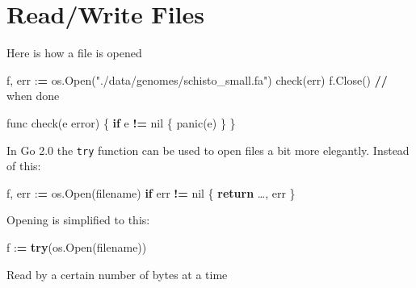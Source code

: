 \documentclass[]{book}
\newenvironment{Shaded}{\begin{snugshade}}{\end{snugshade}}
\newcommand{\CharTok}[1]{\textcolor[rgb]{0.31,0.60,0.02}{#1}}
\newcommand{\ControlFlowTok}[1]{\textcolor[rgb]{0.13,0.29,0.53}{\textbf{#1}}}
\newcommand{\DecValTok}[1]{\textcolor[rgb]{0.00,0.00,0.81}{#1}}
\newcommand{\NormalTok}[1]{#1}
\newcommand{\OperatorTok}[1]{\textcolor[rgb]{0.81,0.36,0.00}{\textbf{#1}}}
\newcommand{\SpecialCharTok}[1]{\textcolor[rgb]{0.00,0.00,0.00}{#1}}
\newcommand{\StringTok}[1]{\textcolor[rgb]{0.31,0.60,0.02}{#1}}
\begin{document}
\hypertarget{readwrite-files}{%
\section{Read/Write Files}\label{readwrite-files}}

Here is how a file is opened

\begin{Shaded}
\begin{Highlighting}[]
\NormalTok{f, err :}\OperatorTok{=}\NormalTok{ os.Open(}\StringTok{"./data/genomes/schisto_small.fa"}\NormalTok{)}
\NormalTok{check(err)}
\NormalTok{f.Close() }\OperatorTok{//}\NormalTok{ when done}

\NormalTok{func check(e error) \{}
    \ControlFlowTok{if}\NormalTok{ e }\OperatorTok{!=}\NormalTok{ nil \{    }
\NormalTok{        panic(e)     }
\NormalTok{    \}                }
\NormalTok{\}}
\end{Highlighting}
\end{Shaded}

In Go 2.0 the \texttt{try} function can be used to open files a bit more elegantly.
Instead of this:

\begin{Shaded}
\begin{Highlighting}[]
\NormalTok{f, err :}\OperatorTok{=}\NormalTok{ os.Open(filename)}
    \ControlFlowTok{if}\NormalTok{ err }\OperatorTok{!=}\NormalTok{ nil \{}
        \ControlFlowTok{return}\NormalTok{ …, err}
\NormalTok{    \}}
\end{Highlighting}
\end{Shaded}

Opening is simplified to this:

\begin{Shaded}
\begin{Highlighting}[]
\NormalTok{f :}\OperatorTok{=} \ControlFlowTok{try}\NormalTok{(os.Open(filename))}
\end{Highlighting}
\end{Shaded}

Read by a certain number of bytes at a time

\begin{Shaded}
\end{Shaded}
\end{document}
